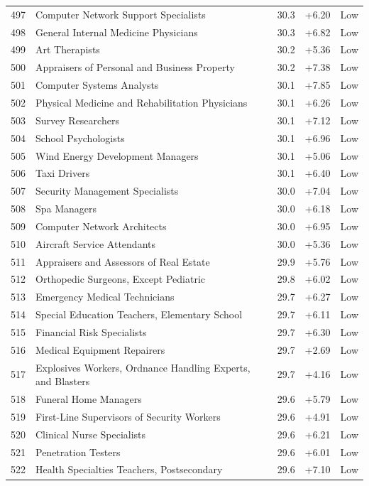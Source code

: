 {\begin{longtable}{rp{7cm}ccc}
497 & Computer Network Support Specialists & 30.3 & +6.20 & Low \\
498 & General Internal Medicine Physicians & 30.3 & +6.82 & Low \\
499 & Art Therapists & 30.2 & +5.36 & Low \\
500 & Appraisers of Personal and Business Property & 30.2 & +7.38 & Low \\
501 & Computer Systems Analysts & 30.1 & +7.85 & Low \\
502 & Physical Medicine and Rehabilitation Physicians & 30.1 & +6.26 & Low \\
503 & Survey Researchers & 30.1 & +7.12 & Low \\
504 & School Psychologists & 30.1 & +6.96 & Low \\
505 & Wind Energy Development Managers & 30.1 & +5.06 & Low \\
506 & Taxi Drivers & 30.1 & +6.40 & Low \\
507 & Security Management Specialists & 30.0 & +7.04 & Low \\
508 & Spa Managers & 30.0 & +6.18 & Low \\
509 & Computer Network Architects & 30.0 & +6.95 & Low \\
510 & Aircraft Service Attendants & 30.0 & +5.36 & Low \\
511 & Appraisers and Assessors of Real Estate & 29.9 & +5.76 & Low \\
512 & Orthopedic Surgeons, Except Pediatric & 29.8 & +6.02 & Low \\
513 & Emergency Medical Technicians & 29.7 & +6.27 & Low \\
514 & Special Education Teachers, Elementary School & 29.7 & +6.11 & Low \\
515 & Financial Risk Specialists & 29.7 & +6.30 & Low \\
516 & Medical Equipment Repairers & 29.7 & +2.69 & Low \\
517 & Explosives Workers, Ordnance Handling Experts, and Blasters & 29.7 & +4.16 & Low \\
518 & Funeral Home Managers & 29.6 & +5.79 & Low \\
519 & First-Line Supervisors of Security Workers & 29.6 & +4.91 & Low \\
520 & Clinical Nurse Specialists & 29.6 & +6.21 & Low \\
521 & Penetration Testers & 29.6 & +6.01 & Low \\
522 & Health Specialties Teachers, Postsecondary & 29.6 & +7.10 & Low \\

\end{longtable}}
